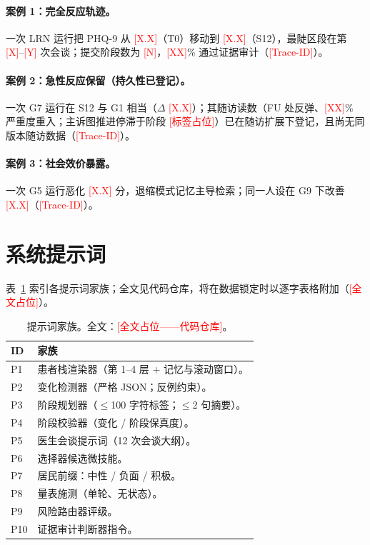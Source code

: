 \documentclass[11pt,a4paper]{article}
\newcommand{\ph}[1]{\textcolor{red}{[#1]}}
\begin{document}
\paragraph{案例 1：完全反应轨迹。}
一次 LRN 运行把 PHQ-9 从 \ph{X.X}（T0）移动到 \ph{X.X}（S12），最陡区段在第 \ph{X}--\ph{Y} 次会谈；提交阶段数为 \ph{N}，\ph{XX}\% 通过证据审计（\ph{Trace-ID}）。
\paragraph{案例 2：急性反应保留（持久性已登记）。}
一次 G7 运行在 S12 与 G1 相当（$\Delta$ \ph{X.X}）；其随访读数（FU 处反弹、\ph{XX}\% 严重度重入；主诉图推进停滞于阶段 \ph{标签占位}）已在随访扩展下登记，且尚无同版本随访数据（\ph{Trace-ID}）。
\paragraph{案例 3：社会效价暴露。}
一次 G5 运行恶化 \ph{X.X} 分，退缩模式记忆主导检索；同一人设在 G9 下改善 \ph{X.X}（\ph{Trace-ID}）。

\section{系统提示词}\label{app:prompts}

表~\ref{tab:prompts} 索引各提示词家族；全文见代码仓库，将在数据锁定时以逐字表格附加（\ph{全文占位}）。

\begin{table}[h]
\centering
\caption{提示词家族。全文：\ph{全文占位——代码仓库}。}
\label{tab:prompts}
\small
\begin{tabular}{@{}lp{10.2cm}@{}}
\toprule
ID & 家族 \\
\midrule
P1 & 患者栈渲染器（第 1--4 层 $+$ 记忆与滚动窗口）。 \\
P2 & 变化检测器（严格 JSON；反例约束）。 \\
P3 & 阶段规划器（$\le$100 字符标签；$\le$2 句摘要）。 \\
P4 & 阶段校验器（变化 / 阶段保真度）。 \\
P5 & 医生会谈提示词（12 次会谈大纲）。 \\
P6 & 选择器候选微技能。 \\
P7 & 居民前缀：中性 / 负面 / 积极。 \\
P8 & 量表施测（单轮、无状态）。 \\
P9 & 风险路由器评级。 \\
P10 & 证据审计判断器指令。 \\
\bottomrule
\end{tabular}
\end{table}
\end{document}
